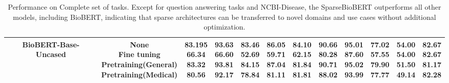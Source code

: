 \begin{table}[htb!]
{\begin{tabular}{cc|ccccc|ccc|cc}
    BioBERT-Base-Uncased &  \makecell{None \\ Fine tuning \\ Pretraining(General) \\ Pretraining(Medical)}  &\makecell{83.195 \\ 66.34 \\\textbf{83.32} \\ 80.56 } &  \makecell{93.63 \\ 66.60 \\ \textbf{93.81} \\92.17 } & \makecell{83.46 \\ 52.69 \\ 84.15 \\ 78.84}&  \makecell{86.05 \\ 59.71 \\\textbf{87.04} \\ 81.11} &  \makecell{\textbf{84.10} \\62.15 \\ 81.84 \\ 81.81 } &   \makecell{90.66 \\ 80.28 \\ \textbf{90.71} \\ 88.02} &  \makecell{95.01 \\ 87.60  \\ \textbf{95.02} \\ 93.99} &  \makecell{77.02 \\ 57.55 \\ \textbf{79.90} \\ 77.77} &   \makecell{\textbf{54.00}\\ \textbf{54.00} \\ 51.50 \\ 49.14} &  \makecell{\textbf{82.67}\\ \textbf{82.67} \\ 81.17 \\ 82.28} \\
    \bottomrule
    \end{tabular}
    }
    \caption{Performance on Complete set of tasks. Except for question answering tasks and NCBI-Disease, the SparseBioBERT outperforms all other models, including BioBERT, indicating that sparse architectures can be transferred to novel domains and use cases without additional optimization. }
    \label{tab:full}
    \vspace{-1.2em}
\end{table}
